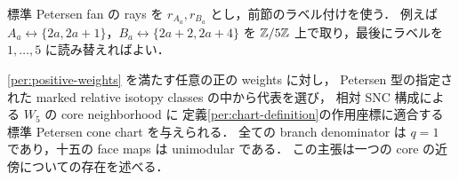 標準 Petersen fan の rays を $r_{A_a},r_{B_a}$ とし，前節のラベル付けを使う．
例えば $A_a\leftrightarrow\{2a,2a+1\}$，$B_a\leftrightarrow\{2a+2,2a+4\}$ を
$\mathbb Z/5\mathbb Z$ 上で取り，最後にラベルを $1,\ldots,5$ に読み替えればよい．

\begin{theorem}
\label{per:local-realization}
\eqref{per:positive-weights} を満たす任意の正の weights に対し，
Petersen 型の指定された marked relative isotopy classes の中から代表を選び，
相対 SNC 構成による $W_5$ の core neighborhood に
定義\ref{per:chart-definition}の作用座標に適合する標準 Petersen cone chart を与えられる．
全ての branch denominator は $q=1$ であり，十五の face maps は unimodular である．
この主張は一つの core の近傍についての存在を述べる．
\end{theorem}

